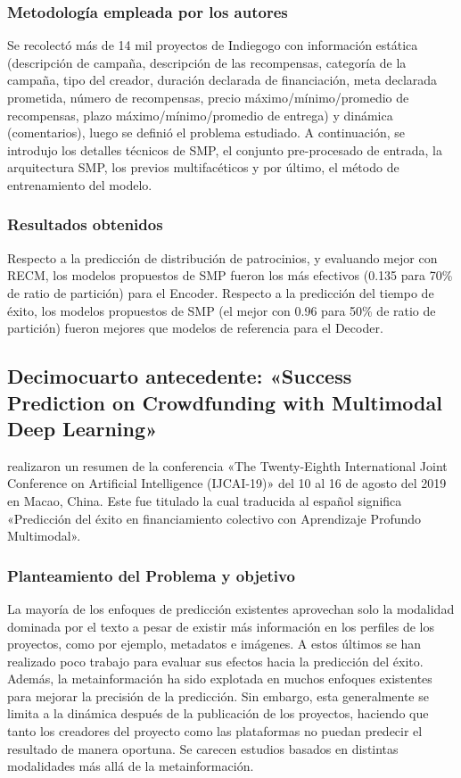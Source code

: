 \subsubsection{Metodología empleada por los autores}
Se recolectó más de 14 mil proyectos de Indiegogo con información estática (descripción de campaña, descripción de las recompensas, categoría de la campaña, tipo del creador, duración declarada de financiación, meta declarada prometida, número de recompensas, precio máximo/mínimo/promedio de recompensas, plazo máximo/mínimo/promedio de entrega) y dinámica (comentarios), luego se definió el problema estudiado. A continuación, se introdujo los detalles técnicos de SMP, el conjunto pre-procesado de entrada, la arquitectura SMP, los previos multifacéticos y por último, el método de entrenamiento del modelo.

\subsubsection{Resultados obtenidos}
Respecto a la predicción de distribución de patrocinios, y evaluando mejor con RECM, los modelos propuestos de SMP fueron los más efectivos (0.135 para 70\% de ratio de partición) para el Encoder.
Respecto a la predicción del tiempo de éxito, los modelos propuestos de SMP (el mejor con 0.96 para 50\% de ratio de partición) fueron mejores que modelos de referencia para el Decoder.

\subsection{Decimocuarto antecedente: «Success Prediction on Crowdfunding with Multimodal Deep Learning» \citep*{pr_cheng2019deeplearning}}
\citeauthor{pr_cheng2019deeplearning} realizaron un resumen de la conferencia «The Twenty-Eighth International Joint Conference on Artificial Intelligence (IJCAI-19)» del 10 al 16 de agosto del 2019 en Macao, China. Este fue titulado  la cual traducida al español significa «Predicción del éxito en financiamiento colectivo con Aprendizaje Profundo Multimodal».

\subsubsection{Planteamiento del Problema y objetivo}
La mayoría de los enfoques de predicción existentes aprovechan solo la modalidad dominada por el texto a pesar de existir más información en los perfiles de los proyectos, como por ejemplo, metadatos e imágenes. A estos últimos se han realizado poco trabajo para evaluar sus efectos hacia la predicción del éxito. Además, la metainformación ha sido explotada en muchos enfoques existentes para mejorar la precisión de la predicción. Sin embargo, esta generalmente se limita a la dinámica después de la publicación de los proyectos, haciendo que tanto los creadores del proyecto como las plataformas no puedan predecir el resultado de manera oportuna. Se carecen estudios basados en distintas modalidades más allá de la metainformación.

